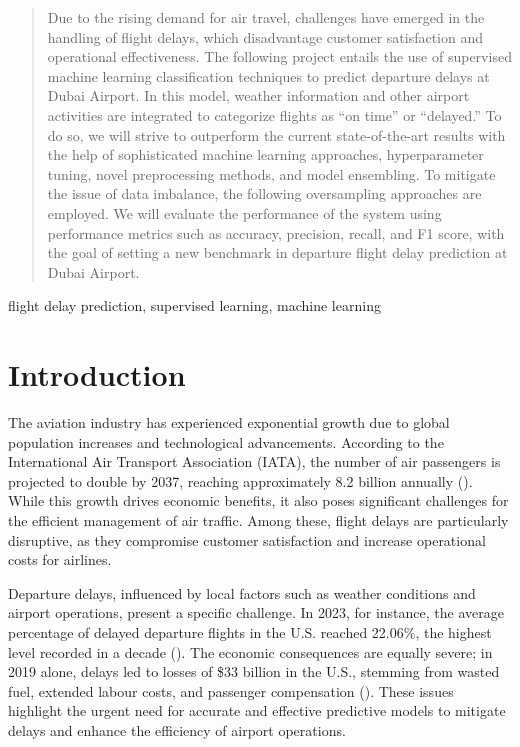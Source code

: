 \documentclass[twoside,11pt]{article}
\begin{document}
\begin{abstract}%
Due to the rising demand for air travel, challenges have emerged in the handling of flight delays, which disadvantage customer satisfaction and operational effectiveness. The following project entails the use of supervised machine learning classification techniques to predict departure delays at Dubai Airport. In this model, weather information and other airport activities are integrated to categorize flights as “on time” or “delayed.” To do so, we will strive to outperform the current state-of-the-art results with the help of sophisticated machine learning approaches, hyperparameter tuning, novel preprocessing methods, and model ensembling. To mitigate the issue of data imbalance, the following oversampling approaches are employed. We will evaluate the performance of the system using performance metrics such as accuracy, precision, recall, and F1 score, with the goal of setting a new benchmark in departure flight delay prediction at Dubai Airport. 
\end{abstract}

\begin{keywords}
  flight delay prediction, supervised learning, machine learning
\end{keywords}

\section{Introduction}

The aviation industry has experienced exponential growth due to global population increases and technological advancements. According to the International Air Transport Association (IATA), the number of air passengers is projected to double by 2037, reaching approximately 8.2 billion annually (\citealp{usAirlineSawRecord}). While this growth drives economic benefits, it also poses significant challenges for the efficient management of air traffic. Among these, flight delays are particularly disruptive, as they compromise customer satisfaction and increase operational costs for airlines. 

Departure delays, influenced by local factors such as weather conditions and airport operations, present a specific challenge. In 2023, for instance, the average percentage of delayed departure flights in the U.S. reached 22.06\%, the highest level recorded in a decade (\citealp{bart2024}). The economic consequences are equally severe; in 2019 alone, delays led to losses of \$33 billion in the U.S., stemming from wasted fuel, extended labour costs, and passenger compensation (\citealp{aA2024}). These issues highlight the urgent need for accurate and effective predictive models to mitigate delays and enhance the efficiency of airport operations. 
\end{document}
